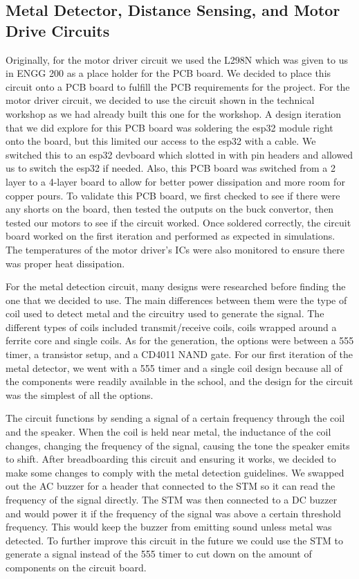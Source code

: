 \documentclass[11pt]{article}
\begin{document}
\subsection{Metal Detector, Distance Sensing, and Motor Drive Circuits}
Originally, for the motor driver circuit we used the L298N which was given to us in ENGG 200 as a place holder for the PCB board. We decided to place this circuit onto a PCB board to fulfill the PCB requirements for the project. For the motor driver circuit, we decided to use the circuit shown in the technical workshop as we had already built this one for the workshop. A design iteration that we did explore for this PCB board was soldering the esp32 module right onto the board, but this limited our access to the esp32 with a cable. We switched this to an esp32 devboard which slotted in with pin headers and allowed us to switch the esp32 if needed. Also, this PCB board was switched from a 2 layer to a 4-layer board to allow for better power dissipation and more room for copper pours. To validate this PCB board, we first checked to see if there were any shorts on the board, then tested the outputs on the buck convertor, then tested our motors to see if the circuit worked. Once soldered correctly, the circuit board worked on the first iteration and performed as expected in simulations. The temperatures of the motor driver's ICs were also monitored to ensure there was proper heat dissipation.

For the metal detection circuit, many designs were researched before finding the one that we decided to use. The main differences between them were the type of coil used to detect metal and the circuitry used to generate the signal. The different types of coils included transmit/receive coils, coils wrapped around a ferrite core and single coils. As for the generation, the options were between a 555 timer, a transistor setup, and a CD4011 NAND gate. For our first iteration of the metal detector, we went with a 555 timer and a single coil design because all of the components were readily available in the school, and the design for the circuit was the simplest of all the options.


The circuit functions by sending a signal of a certain frequency through the coil and the speaker. When the coil is held near metal, the inductance of the coil changes, changing the frequency of the signal, causing the tone the speaker emits to shift. After breadboarding this circuit and ensuring it works, we decided to make some changes to comply with the metal detection guidelines. We swapped out the AC buzzer for a header that connected to the STM so it can read the frequency of the signal directly. The STM was then connected to a DC buzzer and would power it if the frequency of the signal was above a certain threshold frequency. This would keep the buzzer from emitting sound unless metal was detected.  To further improve this circuit in the future we could use the STM to generate a signal instead of the 555 timer to cut down on the amount of components on the circuit board.
\end{document}
